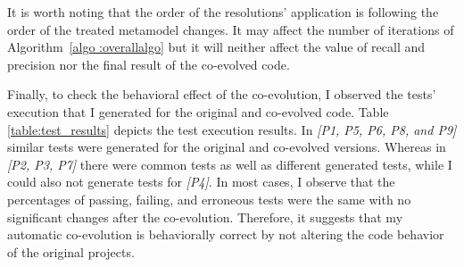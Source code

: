 It is worth noting that the order of the resolutions’ application is following the order of the treated metamodel changes. It may affect the number of iterations of Algorithm~\ref{algo :overallalgo} but it will neither affect the value of recall and precision nor the final result of the co-evolved code.

Finally, to check the behavioral effect of the co-evolution, I observed the tests' execution that I generated for the original and co-evolved code. %
Table \ref{table:test_results} depicts the test execution results. In \emph{[P1, P5, P6, P8, and P9]} similar tests were generated for the original and co-evolved versions. Whereas in \emph{[P2, P3, P7]} there were common tests as well as different generated tests, while I could also not generate tests for \emph{[P4]}. In most cases, I observe that the percentages of passing, failing, and erroneous tests were the same with no significant changes after the co-evolution. 
Therefore, it suggests that my automatic co-evolution is behaviorally correct by not altering the code behavior of the original projects. 


